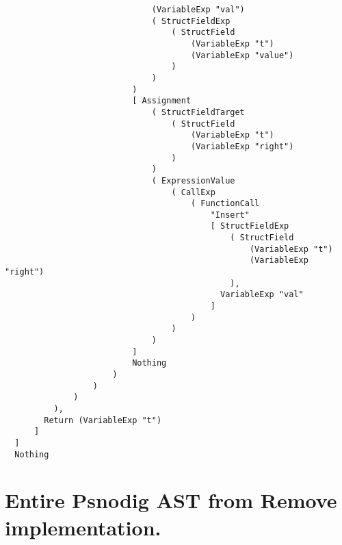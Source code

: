 \begin{lstlisting}
                              (VariableExp "val")
                              ( StructFieldExp
                                  ( StructField
                                      (VariableExp "t")
                                      (VariableExp "value")
                                  )
                              )
                          )
                          [ Assignment
                              ( StructFieldTarget
                                  ( StructField
                                      (VariableExp "t")
                                      (VariableExp "right")
                                  )
                              )
                              ( ExpressionValue
                                  ( CallExp
                                      ( FunctionCall
                                          "Insert"
                                          [ StructFieldExp
                                              ( StructField
                                                  (VariableExp "t")
                                                  (VariableExp "right")
                                              ),
                                            VariableExp "val"
                                          ]
                                      )
                                  )
                              )
                          ]
                          Nothing
                      )
                  )
              )
          ),
        Return (VariableExp "t")
      ]
  ]
  Nothing
\end{lstlisting}

\section{Entire Psnodig AST from Remove implementation.}
\label{appendix:Entire Psnodig AST from Remove implementation.}


